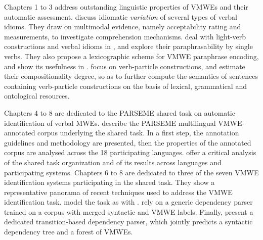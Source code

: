 \documentclass[output=paper,
modfonts,
]{langscibook}
\begin{document}
Chapters 1 %
to 3 %
address outstanding linguistic properties of VMWEs and their automatic assessment.   discuss idiomatic \emph{variation} of several types of  verbal idioms. They %
draw on multimodal evidence, namely acceptability rating and  measurements, to investigate comprehension mechanisms.  deal with light-verb constructions and verbal idioms in , and explore their paraphrasability by single verbs. They also propose a lexicographic scheme for VMWE paraphrase encoding, and show its usefulness in .   focus on  verb-particle constructions, and estimate their compositionality degree, so as to further compute the semantics of sentences containing verb-particle constructions %
on the basis of lexical, grammatical and ontological resources.

\newpage 
Chapters 4 %
to 8 %
are dedicated to the PARSEME shared task on automatic identification of verbal MWEs.  describe %
the PARSEME multilingual VMWE-annotated corpus underlying the shared task. In a first step, the annotation guidelines and methodology are presented, then 
the properties of the annotated corpus are analysed across the 18 participating languages.  offer a critical analysis of the shared task organization and of its results across languages and participating systems. Chapters 6 to 8 %
are dedicated to three of the seven %
VMWE identification systems participating in the shared task. They show a representative panorama of recent techniques used to address the VMWE identification task.   model the task as  with .   rely on a generic dependency parser trained on a corpus with merged syntactic and VMWE labels. Finally,  present a dedicated transition-based dependency parser, which jointly predicts a syntactic dependency tree and a forest of VMWEs. 
\end{document}
